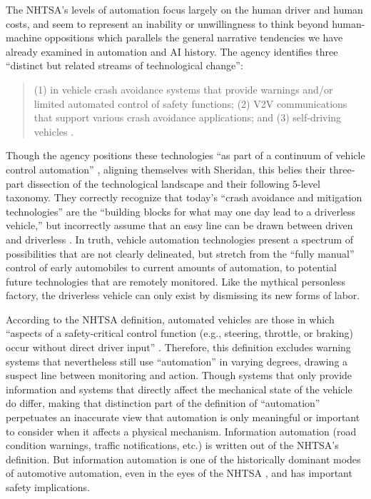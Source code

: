 The NHTSA's levels of automation focus largely on the human driver and
human costs, and seem to represent an inability or unwillingness to
think beyond human-machine oppositions which 
parallels the general narrative tendencies we have already examined in
automation and AI history. 
The agency identifies three ``distinct but related streams of
technological change'': 
\begin{quote}
(1) in vehicle crash avoidance systems that provide warnings and/or
limited automated control of safety functions; (2) V2V communications
that support various crash avoidance applications; and (3)
self-driving vehicles \cite[p. 3]{NHTSA}.\end{quote}
Though the agency positions these technologies ``as part of a
continuum of vehicle control automation'' \cite[p. 3]{NHTSA}, aligning
themselves with Sheridan, this belies
their three-part dissection of the technological landscape and their
following 5-level taxonomy. They correctly recognize that today's
``crash avoidance and mitigation technologies'' are the ``building blocks
for what may one day lead to a driverless vehicle,'' but incorrectly
assume that an easy line can be drawn between driven and
driverless \cite[p. 3]{NHTSA}. In truth, vehicle automation
technologies present a spectrum of possibilities that are not clearly
delineated, but stretch from the ``fully manual'' control of early
automobiles to current amounts of automation, to potential future
technologies that are remotely monitored. Like the mythical personless
factory, the driverless vehicle can only exist by dismissing its new forms
of labor. 


According to the NHTSA definition, automated
vehicles are those in which ``aspects of a safety-critical control
function (e.g., steering, throttle, or braking) occur without direct
driver input'' \cite[p. 3]{NHTSA}. Therefore, this definition excludes warning
systems that nevertheless still use ``automation'' in varying degrees,
drawing a suspect line between monitoring and action. Though systems
that only provide information and systems 
that directly affect the mechanical state of the vehicle do differ, making that
distinction part of the definition of ``automation'' perpetuates an
inaccurate view that automation is only meaningful or important to
consider when it affects a physical mechanism. Information automation
(road condition warnings, traffic notifications, etc.)
is written out of the NHTSA's definition. But information automation
is one of the historically dominant modes of automotive automation,
even in the eyes of the NHTSA \cite[p. 11]{wetmore}, and has important
safety implications.

